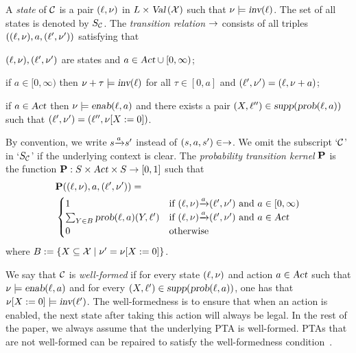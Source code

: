 \smallskip {}
A \emph{state} of $\mathcal{C}$ is a pair $(\ell, \nu)$ in $L\times\mbox{\sl Val}\left(\mathcal{X}\right)$ such that $\nu\models \mbox{\sl inv}(\ell)$.
The set of all states is denoted by $S_{\mathcal{C}}$.
The \emph{transition relation} $\rightarrow$ consists of all triples $((\ell,\nu),a,(\ell',\nu'))$ satisfying that
\begin{compactitem}
\item $(\ell,\nu), (\ell',\nu')$ are states and $a\in\mbox{\sl Act}\cup [0,\infty)$;
\item if $a\in [0,\infty)$ then $\nu+\tau\models \mbox{\sl inv}(\ell)$ for all $\tau\in [0, a]$ and $(\ell',\nu')=(\ell,\nu+a)$;
\item if $a\in\mbox{\sl Act}$ then $\nu\models\mbox{\sl enab}(\ell,a)$ and there exists a pair $(X, \ell'')\in{\mbox{\sl supp}}(\mbox{\sl prob}(\ell,a))$ such that $(\ell',\nu')=(\ell'',{\nu}{\left[X:=0\right]})$.
\end{compactitem}
By convention, we write ${s}{\xrightarrow{a}}{s'}$ instead of $(s,a,s')\in\rightarrow$.
We omit the subscript `$\mathcal{C}$' in `$S_{\mathcal{C}}$' if the underlying context is clear.
The \emph{probability transition kernel} $\mathbf{P}$ is the function $\mathbf{P}:S\times\mbox{\sl Act}\times S\rightarrow[0,1]$ such that
\begin{align*}
    & \mathbf{P}((\ell,\nu),a,(\ell',\nu')) 
        = \\
        & \begin{cases}
            1 &
                \mbox{if }{(\ell,\nu)}{\xrightarrow{a}}{(\ell',\nu')}\mbox{ and } a\in [0,\infty)\\
            \sum_{Y\in B}\mbox{\sl prob}(\ell,a)(Y,\ell') & 
                \mbox{if }{(\ell,\nu)}{\xrightarrow{a}}{(\ell',\nu')}\mbox{ and } a\in\mbox{\sl Act} \\
            0 & 
                \mbox{otherwise}
        \end{cases}
\end{align*}
where $B:=\{X\subseteq\mathcal{X}\mid \nu'={\nu}{\left[X:=0\right]}\}$.

\smallskip {} We say that $\mathcal{C}$ is \emph{well-formed} if for every state $(\ell,\nu)$ and action $a\in\mbox{\sl Act}$ such that $\nu\models\mbox{\sl enab}(\ell,a)$ and for every $(X,\ell')\in {\mbox{\sl supp}}(\mbox{\sl prob}(\ell,a))$, one has that ${\nu}{\left[X:=0\right]}\models\mbox{\sl inv}(\ell')$.
The well-formedness is to ensure that when an action is enabled, the next state after taking this action will always be legal. In the rest of the paper, we always assume that the underlying PTA is well-formed. PTAs that are not well-formed can be repaired to satisfy the well-formedness condition~\cite{DBLP:journals/iandc/KwiatkowskaNSW07}.

